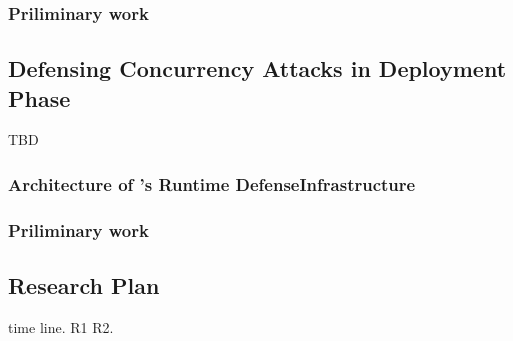 

 

\subsubsection{Priliminary work}\label{sec:detect-result}


\subsection{Defensing Concurrency Attacks in Deployment Phase} 
\label{sec:defense}

TBD

\subsubsection{Architecture of \xxx's Runtime DefenseInfrastructure} 
\label{sec:defense-arch}




\subsubsection{Priliminary work} \label{sec:defense-result}


\subsection{Research Plan} \label{sec:rep}
time line. R1 R2.


